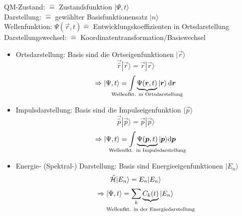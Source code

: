 \begin{comment}
\chapter{Der Liebe Gott}
\section{Verliebt sein}
\subsection{wer darf wo rumfumeln}
rumfumeln ist nicht unabhängig
\subsection{was gehört zu wem}
\section{Gender-Theorie}
es gibt unendliche viele Wahrscheinlichkeiten und Zuordnungen (von Gendern)
\section{Der Satz von Stinson}
\end{comment}



%
%
\noindent
QM-Zustand: $ \widehat = $ Zustandsfunktion $ |\Psi , t \rangle $\\
Darstellung: $ \widehat = $ gewählter Basisfunktionensatz $ | n \rangle $\\
Wellenfunktion: $ \Psi (\vec{r},t) \widehat = $ Entwicklungskoeffizienten in Ortsdarstellung\\
Darstellungswechsel: $ \widehat = $ Koordinatentransformation/Basiswechsel\\
\bei 
\begin{itemize} 
	\item Ortsdarstellung: Basis sind die Ortseigenfunktionen $|\vec{r}\rangle$
	$$\vec{\hat r} | \vec{r} \rangle = \vec{r}| \vec{r}\rangle$$
	$$\Rightarrow |\Psi, t\rangle =\int \underbrace{\Psi(\vec{r},t)}_{\mathclap{\tx{Wellenfkt. in Ortsdarstellung}}}|\vec{r}\rangle \dif\vec{r}$$
	\item Impulsdarstellung: Basis sind die Impulseigenfunktion $|\vec{p}\rangle$
	$$\vec{\hat p} |\vec{p} \rangle = \vec{p} | \vec{p}\rangle$$
	$$\Rightarrow |\Psi, t \rangle =\int \underbrace{\Psi(\vec{p},t)}_{\mathclap{\tx{Wellenfkt. in Impulsdarstellung}}}|\vec{p}\rangle \dd \vec{p}$$
	\item Energie- (Spektral-) Darstellung: Basis sind Energieeigenfunktionen $|E_n \rangle$
	$$\hat {\mathcal{H}}| E_n\rangle = E_n|E_n\rangle$$
	$$\Rightarrow |\Psi,t\rangle =\sum_k \underbrace{C_k (t)}_{\substack{ \\[5pt] \mathclap{\tx{Wellenfkt. in der Energiedarstellung}}}} |E_n\rangle$$
\end{itemize}

